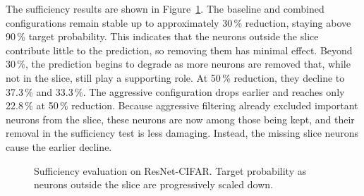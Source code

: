\documentclass[
12pt,
fancyheadings,
a4paper,
twoside,
BCOR=0.7cm,
nobcorignoretitle,
grayscalebody,
]{stsreprt}
\begin{document}
The sufficiency results are shown in Figure~\ref{fig:counterfactual_sufficiency}.
The baseline and combined configurations remain stable up to approximately 30\,\% reduction,
staying above 90\,\% target probability.
This indicates that the neurons outside the slice contribute little to the prediction, so removing
them has minimal effect.
Beyond 30\,\%, the prediction begins to degrade as more neurons are removed that, while not in the
slice, still play a supporting role.
At 50\,\% reduction, they decline to 37.3\,\% and 33.3\,\%.
The aggressive configuration drops earlier and reaches only 22.8\,\% at 50\,\% reduction.
Because aggressive filtering already excluded important neurons from the slice, these neurons are
now among those being kept, and their removal in the sufficiency test is less damaging. Instead,
the missing slice neurons cause the earlier decline.

\begin{figure}[ht]
\centering
{}
\caption{Sufficiency evaluation on ResNet-CIFAR. Target probability as neurons outside the slice are progressively scaled down.}
\label{fig:counterfactual_sufficiency}
\end{figure}
\end{document}
